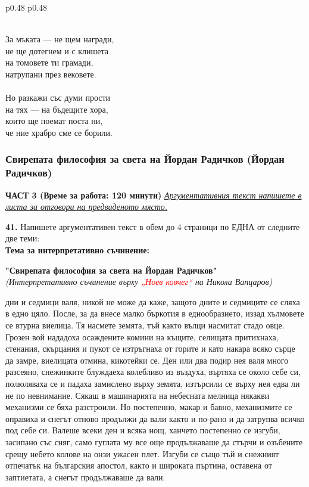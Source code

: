 \documentclass[12pt,a4paper]{article}
\begin{document}
\begin{tabular}{p{0.48\textwidth} p{0.48\textwidth}}
\begin{minipage}[t]{\linewidth}
\\
За мъката — не щем награди,\\
не ще дотегнем и с клишета\\
на томовете ти грамади,\\
натрупани през вековете.\\
\\
Но разкажи със думи прости\\
на тях — на бъдещите хора,\\
които ще поемат поста ни,\\
че ние храбро сме се борили.\\
\end{minipage}
\end{tabular}

\subsubsection{Свирепата философия за света на Йордан Радичков (Йордан Радичков)}
\vspace{0.5cm}
\begin{center}
\textbf{ЧАСТ 3 (Време за работа: 120 минути)}
\vspace{0.2cm}
{\textit{\underline{Аргументативния текст напишете в листа за отговори на предвиденото място.}}}
\vspace{0.1cm}
\end{center}
\textbf{41.} Напишете аргументативен текст в обем до 4 страници по ЕДНА от следните две теми:
\\
\vspace{0.2cm}
\textbf{Тема за интерпретативно съчинение:}
\vspace{0.1cm}
\begin{center}
\textbf{"Свирепата философия за света на Йордан Радичков"}
\\
\textit{(Интерпретативно съчинение върху \textcolor{red}{„Ноев ковчег“} на Никола Вапцаров)}
\end{center}
 дни и седмици валя, никой не може да каже, защото дните и седмиците се сляха в едно цяло. После, за да внесе малко бъркотия в еднообразието, иззад хълмовете се втурна виелица. Тя насмете земята, тъй както вълци насмитат стадо овце. Грозен вой нададоха осаждените комини на къщите, селищата притихнаха, стенания, скърцания и пукот се изтръгнаха от горите и като накара всяко сърце да замре, виелицата отмина, кикотейки се. Ден или два подир нея валя много разсеяно, снежинките блуждаеха колебливо из въздуха, въртяха се около себе си, полюляваха се и падаха замислено върху земята, изтърсили се върху нея едва ли не по невнимание. Сякаш в машинарията на небесната мелница някакви механизми се бяха разстроили. Но постепенно, макар и бавно, механизмите се оправиха и снегът отново продължи да вали както и по-рано и да затрупва всичко под себе си. Валеше всеки ден и всяка нощ, ханчето постепенно се изгуби, засипано със сняг, само гуглата му все още продължаваше да стърчи и озъбените срещу небето колове на онзи ужасен плет. Изгуби се също тъй и снежният отпечатък на българския апостол, както и широката пъртина, оставена от заптиетата, а снегът продължаваше да вали.
\end{document}
